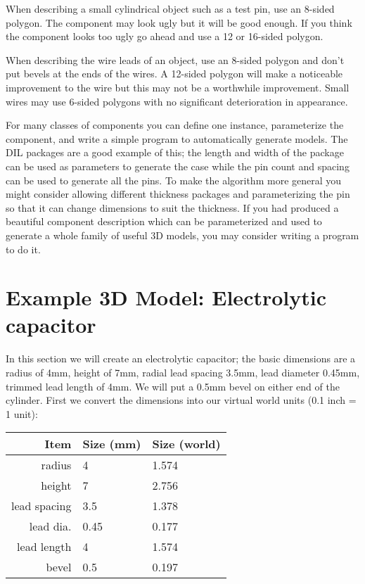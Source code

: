 \documentclass[a4paper, dvipdfm]{article}
\begin{document}
When describing a small cylindrical object such as a test pin, use an 8-sided polygon. The component may
look ugly but it will be good enough. If you think the component looks too ugly go ahead and use a 12 or
16-sided polygon.

When describing the wire leads of an object, use an 8-sided polygon and don't put bevels at the ends
of the wires. A 12-sided polygon will make a noticeable improvement to the wire but this may not be a
worthwhile improvement. Small wires may use 6-sided polygons with no significant deterioration in
appearance.

For many classes of components you can define one instance, parameterize the component, and write a simple
program to automatically generate models. The DIL packages are a good example of this; the length and
width of the package can be used as parameters to generate the case while the pin count and spacing can be
used to generate all the pins. To make the algorithm more general you might consider allowing different
thickness packages and parameterizing the pin so that it can change dimensions to suit the thickness. If you
had produced a beautiful component description which can be parameterized and used to generate a whole
family of useful 3D models, you may consider writing a program to do it.

\section{Example 3D Model: Electrolytic capacitor}
In this section we will create an electrolytic capacitor; the basic dimensions are a radius of 4mm, height of
7mm, radial lead spacing 3.5mm, lead diameter 0.45mm, trimmed lead length of 4mm. We will put a 0.5mm bevel on
either end of the cylinder. First we convert the dimensions into our virtual world units (0.1 inch = 1 unit):

\begin{tabular}{|r|l|l|}
\hline
Item & Size (mm) & Size (world) \\
\hline
radius & 4 & 1.574\\
height & 7 & 2.756\\
lead spacing & 3.5 & 1.378\\
lead dia. & 0.45 & 0.177\\
lead length & 4 & 1.574\\
bevel & 0.5 & 0.197\\
\hline
\end{tabular}
\end{document}
